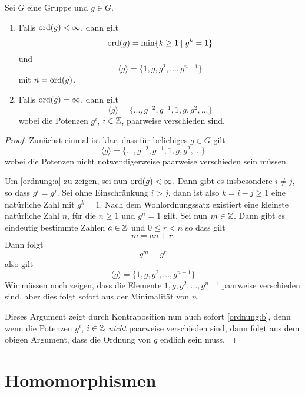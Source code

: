 \documentclass{book}
\begin{document}
\begin{prop}
    \label{prop:ordnung} Sei $G$ eine Gruppe und $g \in G$. 
    \begin{enumerate}
        \item\label{ordnung:a} Falls $\operatorname{ord}(g) < \infty$, dann gilt 
            \[
                \operatorname{ord}(g) = \min \{ k \geq 1 \; | \; g^k = 1 \}
            \]
            und 
            \[
                \langle g \rangle = \{ 1, g, g^2, ..., g^{n-1} \}
            \]
            mit $n = \operatorname{ord}(g)$. 
        \item\label{ordnung:b} Falls $\operatorname{ord}(g) = \infty$, dann gilt 
            \[
                \langle g \rangle = \{ ... , g^{-2}, g^{-1}, 1, g, g^2, ... \}
            \]
            wobei die Potenzen $g^i$, $i \in \mathbb{Z}$, paarweise verschieden sind. 
    \end{enumerate}
\end{prop}
\begin{proof}
    Zunächst einmal ist klar, dass für beliebiges $g \in G$ gilt
    \[
        \langle g \rangle = \{ ... , g^{-2}, g^{-1}, 1, g, g^2, ... \}
    \]
    wobei die Potenzen nicht notwendigerweise paarweise verschieden sein
    müssen. 

    Um \ref{ordnung:a} zu zeigen, sei nun $\operatorname{ord}(g) < \infty$. Dann gibt es
    insbesondere $i \neq j$, so dass $g^i = g^j$. Sei ohne Einschränkung $i >
    j$, dann ist also $k = i-j \geq 1$ eine natürliche Zahl mit $g^k = 1$. Nach
    dem Wohlordnungssatz existiert eine kleinste natürliche Zahl $n$, für die
    $n \geq 1 $ und $g^n = 1$ gilt. Sei nun $m \in \mathbb{Z}$. Dann gibt es eindeutig bestimmte
    Zahlen $a \in \mathbb{Z}$ und $0 \leq r < n$ so dass gilt
    \[
        m = a n + r.
    \]
    Dann folgt
    \[
        g^m = g^r
    \]
    also gilt
    \[
          \langle g \rangle = \{ 1, g, g^2, ..., g^{n-1} \}
    \]
    Wir müssen noch zeigen, dass die Elemente $1, g, g^2, ..., g^{n-1}$
    paarweise verschieden sind, aber dies folgt sofort aus der Minimalität von
    $n$. 

    Dieses Argument zeigt durch Kontraposition nun auch sofort \ref{ordnung:b}, denn wenn
    die Potenzen $g^i$, $i \in \mathbb{Z}$ {\em nicht} paarweise verschieden sind, dann folgt
    aus dem obigen Argument, dass die Ordnung von $g$ endlich sein muss. 
\end{proof}


\section{Homomorphismen}%
\label{sec:homomorphismen}
\end{document}
